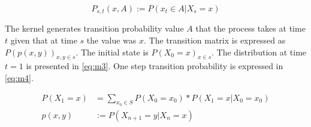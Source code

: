 \begin{equation} \label{eq:m2}
P_{s,t} (x,A) := P(x_t \in A | X_s =x)
\end{equation}

The kernel generates transition probability value $A$ that the process takes at time $t$ given that at time $s$ the value was $x$. The transition matrix is expressed as $P(p(x,y))_{x,y \in s}$. The initial state is $P(X_0 =x)_{x \in s}$. The distribution at time $t=1$ is presented in \eqref{eq:m3}. One step transition probability is expressed in \eqref{eq:m4}. 

 \begin{align} 
P(X_1 =x) &= \sum_{x_0 \in S} P(X_0 = x_0) * P(X_1 =x | X_0 =x_0)  \\  \label{eq:m3}
p(x,y) & := P(X_{n+1} = y | X_n =x)   \\ \label{eq:m4}
\end{align}
  
